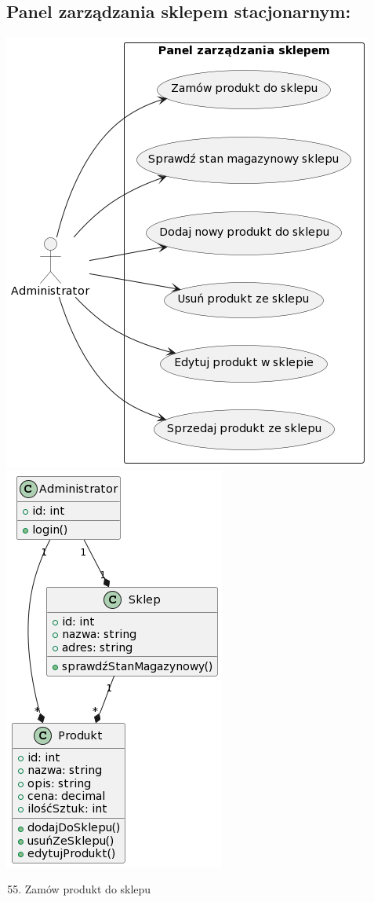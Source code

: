 \documentclass[
]{article}
\providecommand{\tightlist}{%
  \setlength{\itemsep}{0pt}\setlength{\parskip}{0pt}}
\begin{document}
\hypertarget{h.q7tyc5bsqba0}{%
\subsection{\texorpdfstring{{Panel zarządzania sklepem
stacjonarnym:}}{Panel zarządzania sklepem stacjonarnym:}}\label{h.q7tyc5bsqba0}}
\includegraphics{diagrams/use_cases/sklep.png}
\includegraphics{diagrams/class/sklep_klasy.png}
\begin{enumerate}
\setcounter{enumi}{54}
\tightlist
\item
  {Zamów produkt do sklepu}
\end{enumerate}
\end{document}
